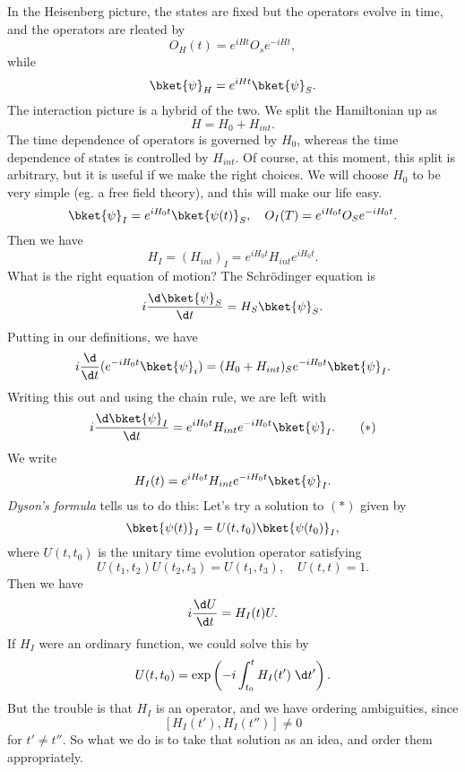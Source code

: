 \documentclass[a4paper]{article}
\begin{document}
In the Heisenberg picture, the states are fixed but the operators evolve in time, and the operators are rleated by
\[
  O_H(t) = e^{iHt}O_s e^{-iHt},
\]
while
\[
  \bket{\psi}_H = e^{iHt}\bket{\psi}_S.
\]
The interaction picture is a hybrid of the two. We split the Hamiltonian up as
\[
  H = H_0 + H_{int}.
\]
The time dependence of operators is governed by $H_0$, whereas the time dependence of states is controlled by $H_{int}$. Of course, at this moment, this split is arbitrary, but it is useful if we make the right choices. We will choose $H_0$ to be very simple (eg. a free field theory), and this will make our life easy.
\[
  \bket{\psi}_I = e^{iH_0 t} \bket{\psi(t)}_S, \quad O_I(T) = e^{iH_0 t} O_S e^{-iH_0 t}.
\]
Then we have
\[
  H_I = (H_{int})_I = e^{iH_0 t} H_{int} e^{iH_0 t}.
\]
What is the right equation of motion? The Schr\"odinger equation is
\[
  i \frac{\d \bket{\psi}_S}{\d t} = H_S \bket{\psi}_S.
\]
Putting in our definitions, we have
\[
  i \frac{\d}{\d t}(e^{-iH_0 t}\bket{\psi}_i) = (H_0 + H_{int})_S e^{-iH_0 t} \bket{\psi}_I.
\]
Writing this out and using the chain rule, we are left with
\[
  i \frac{\d \bket{\psi}_I}{\d t} = e^{iH_0 t} H_{int} e^{-iH_0 t} \bket{\psi}_I.\tag{$*$}
\]
We write
\[
  H_I(t) = e^{iH_0 t} H_{int} e^{-iH_0 t} \bket{\psi}_I.
\]
\emph{Dyson's formula} tells us to do this: Let's try a solution to $(*)$ given by
\[
  \bket{\psi(t)}_I = U(t, t_0) \bket{\psi(t_0)}_I,
\]
where $U(t, t_0)$ is the unitary time evolution operator satisfying
\[
  U(t_1, t_2) U(t_2, t_3) = U(t_1, t_3),\quad U(t, t) = 1.
\]
Then we have
\[
  i \frac{\d U}{\d t} = H_I(t) U.
\]
If $H_I$ were an ordinary function, we could solve this by
\[
  U(t, t_0) = \exp\left(-i \int_{t_0}^t H_I(t') \;\d t'\right).
\]
But the trouble is that $H_I$ is an operator, and we have ordering ambiguities, since
\[
  [H_I(t'), H_I(t'')] \not= 0
\]
for $t' \not= t''$. So what we do is to take that solution as an idea, and order them appropriately.
\end{document}
